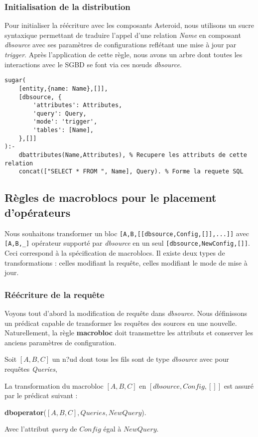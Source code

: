 \subsubsection{Initialisation de la distribution}
Pour initialiser la réécriture avec les composants Asteroid, nous utilisons un sucre syntaxique permettant de traduire l'appel d'une relation \textit{Name} en composant \textit{dbsource} avec ses paramètres de configurations reflétant une mise à jour par \textit{trigger}. Après l'application de cette règle, nous avons un arbre dont toutes les interactions avec le SGBD se font via ces nœuds \textit{dbsource}.
\begin{lstlisting}
sugar(
    [entity,{name: Name},[]],
    [dbsource, {
        'attributes': Attributes,
        'query': Query,
        'mode': 'trigger', 
        'tables': [Name],
    },[]]
):-
    dbattributes(Name,Attributes), % Recupere les attributs de cette relation
    concat(["SELECT * FROM ", Name], Query). % Forme la requete SQL
\end{lstlisting}

\subsection{Règles de macroblocs pour le placement d'opérateurs}
Nous souhaitons transformer un bloc \lstinline|[A,B,[[dbsource,Config,[]],...]]| avec \lstinline|[A,B,_]| opérateur supporté par \textit{dbsource} en un seul \lstinline|[dbsource,NewConfig,[]]|. Ceci correspond à la spécification de macroblocs. Il existe deux types de transformations : celles modifiant la requête, celles modifiant le mode de mise à jour.

\subsubsection{Réécriture de la requête}
Voyons tout d'abord la modification de requête dans \textit{dbsource}. Nous définissons un prédicat capable de transformer les requêtes des sources en une nouvelle. Naturellement, la règle \textbf{macrobloc} doit transmettre les attributs et conserver les anciens paramètres de configuration.
\begin{regle}
    Soit $[A,B,C]$ un n?ud dont tous les fils sont de type \textit{dbsource} avec pour requêtes \textit{Queries},

    La transformation du macrobloc $[A,B,C]$ en $[dbsource,Config,[]]$ est assuré par le prédicat suivant :
    \begin{center} \textbf{dboperator}($[A,B,C], Queries, NewQuery$). \end{center}
    Avec l'attribut \textit{query} de $Config$ égal à $NewQuery$.
\end{regle}

